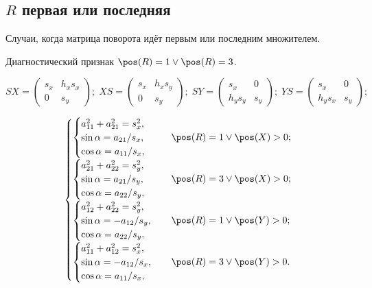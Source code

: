 \subsection{$R$ первая или последняя}

Случаи, когда матрица поворота идёт первым или последним множителем.

Диагностический признак $\pos(R)=1 \vee \pos(R)=3 $.

$$
SX = \begin{pmatrix}s_x & h_xs_x \\ 0 & s_y\end{pmatrix};\;
XS = \begin{pmatrix}s_x & h_xs_y \\ 0 & s_y\end{pmatrix};\;
SY = \begin{pmatrix}s_x & 0 \\ h_ys_y & s_y\end{pmatrix};\;
YS = \begin{pmatrix}s_x & 0 \\ h_ys_x & s_y\end{pmatrix};
$$

$$
\begin{cases}
	\begin{cases}
		a_{11}^2 + a_{21}^2 = s_x^2, \\
		\sin\alpha = a_{21}/s_x,\\
		\cos\alpha = a_{11}/s_x,
	\end{cases} & \pos(R)=1 \vee \pos(X)>0;\\
	\begin{cases}
		a_{21}^2 + a_{22}^2 = s_y^2, \\
		\sin\alpha = a_{21}/s_y,\\
		\cos\alpha = a_{22}/s_y,
	\end{cases} & \pos(R)=3 \vee \pos(X)>0;\\
	\begin{cases}
		a_{12}^2 + a_{22}^2 = s_y^2,\\
		\sin\alpha = -a_{12}/s_y,\\
		\cos\alpha = a_{22}/s_y,
	\end{cases} & \pos(R)=1 \vee \pos(Y)>0;\\
	\begin{cases}
		a_{11}^2 + a_{12}^2 = s_x^2,\\
		\sin\alpha = -a_{12}/s_x,\\
		\cos\alpha = a_{11}/s_x,
	\end{cases} & \pos(R)=3 \vee \pos(Y)>0.\\
\end{cases}
$$

